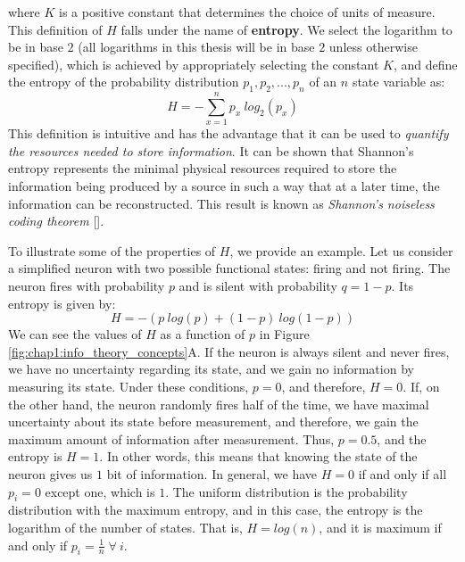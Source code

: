 where $K$ is a positive constant that determines the choice of units of measure.
This definition of $H$ falls under the name of \textbf{entropy}. 
We select the logarithm to be in base $2$ (all logarithms in this thesis will be in base $2$ unless otherwise specified), which is achieved by appropriately selecting the constant $K$, and define the entropy of the probability distribution $p_1,p_2,...,p_n$ of an $n$ state variable as:
\begin{equation}
\label{eqn:entropy}
    H=- \sum_{x=1}^n p_x\ log_2 (p_x)
\end{equation}
This definition is intuitive and has the advantage that it can be used to \textit{quantify the resources needed to store information}. 
It can be shown that Shannon's entropy represents the minimal physical resources required to store the information being produced by a source in such a way that at a later time, the information can be reconstructed.
This result is known as \textit{Shannon’s noiseless coding theorem} [\cite{shannon1948}].

To illustrate some of the properties of $H$, we provide an example. Let us consider a simplified neuron with two possible functional states: firing and not firing. The neuron fires with probability $p$ and is silent with probability $q=1-p$. Its entropy is given by:
\begin{equation}
    H=-(p\ log (p) + (1-p)\ log (1-p))
\end{equation}
We can see the values of $H$ as a function of $p$ in Figure \ref{fig:chap1:info_theory_concepts}A.
If the neuron is always silent and never fires, we have no uncertainty regarding its state, and we gain no information by measuring its state.
Under these conditions, $p=0$, and therefore, $H=0$.
If, on the other hand, the neuron randomly fires half of the time, we have maximal uncertainty about its state before measurement, and therefore, we gain the maximum amount of information after measurement.
Thus, $p=0.5$, and the entropy is $H=1$.
In other words, this means that knowing the state of the neuron gives us $1$ bit of information.
In general, we have $H=0$ if and only if all $p_i=0$ except one, which is $1$. 
The uniform distribution is the probability distribution with the maximum entropy, and in this case, the entropy is the logarithm of the number of states.
That is, $H=log(n)$, and it is maximum if and only if $p_i=\frac{1}{n} \; \forall \ i$.

